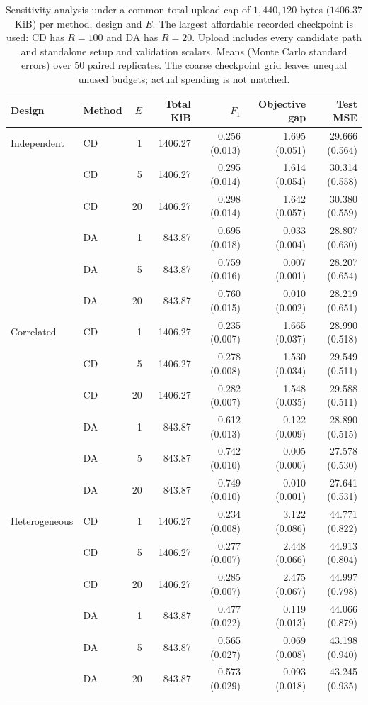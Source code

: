 \begin{table}[htbp]
\centering\small
\setlength{\tabcolsep}{4pt}
\caption{Sensitivity analysis under a common total-upload cap of $1{,}440{,}120$ bytes ($1406.37$ KiB) per method, design and $E$. The largest affordable recorded checkpoint is used: CD has $R=100$ and DA has $R=20$. Upload includes every candidate path and standalone setup and validation scalars. Means (Monte Carlo standard errors) over 50 paired replicates. The coarse checkpoint grid leaves unequal unused budgets; actual spending is not matched.}
\label{tab:budget-total-cap}
\begin{tabular}{llrrrrr}
\toprule
Design & Method & $E$ & Total KiB & $F_1$ & Objective gap & Test MSE \\
\midrule
Independent & CD & 1 & 1406.27 & 0.256 (0.013) & 1.695 (0.051) & 29.666 (0.564) \\
 & CD & 5 & 1406.27 & 0.295 (0.014) & 1.614 (0.054) & 30.314 (0.558) \\
 & CD & 20 & 1406.27 & 0.298 (0.014) & 1.642 (0.057) & 30.380 (0.559) \\
 & DA & 1 & 843.87 & 0.695 (0.018) & 0.033 (0.004) & 28.807 (0.630) \\
 & DA & 5 & 843.87 & 0.759 (0.016) & 0.007 (0.001) & 28.207 (0.654) \\
 & DA & 20 & 843.87 & 0.760 (0.015) & 0.010 (0.002) & 28.219 (0.651) \\
\addlinespace
Correlated & CD & 1 & 1406.27 & 0.235 (0.007) & 1.665 (0.037) & 28.990 (0.518) \\
 & CD & 5 & 1406.27 & 0.278 (0.008) & 1.530 (0.034) & 29.549 (0.511) \\
 & CD & 20 & 1406.27 & 0.282 (0.007) & 1.548 (0.035) & 29.588 (0.511) \\
 & DA & 1 & 843.87 & 0.612 (0.013) & 0.122 (0.009) & 28.890 (0.515) \\
 & DA & 5 & 843.87 & 0.742 (0.010) & 0.005 (0.000) & 27.578 (0.530) \\
 & DA & 20 & 843.87 & 0.749 (0.010) & 0.010 (0.001) & 27.641 (0.531) \\
\addlinespace
Heterogeneous & CD & 1 & 1406.27 & 0.234 (0.008) & 3.122 (0.086) & 44.771 (0.822) \\
 & CD & 5 & 1406.27 & 0.277 (0.007) & 2.448 (0.066) & 44.913 (0.804) \\
 & CD & 20 & 1406.27 & 0.285 (0.007) & 2.475 (0.067) & 44.997 (0.798) \\
 & DA & 1 & 843.87 & 0.477 (0.022) & 0.119 (0.013) & 44.066 (0.879) \\
 & DA & 5 & 843.87 & 0.565 (0.027) & 0.069 (0.008) & 43.198 (0.940) \\
 & DA & 20 & 843.87 & 0.573 (0.029) & 0.093 (0.018) & 43.245 (0.935) \\
\addlinespace
\bottomrule
\end{tabular}
\end{table}
